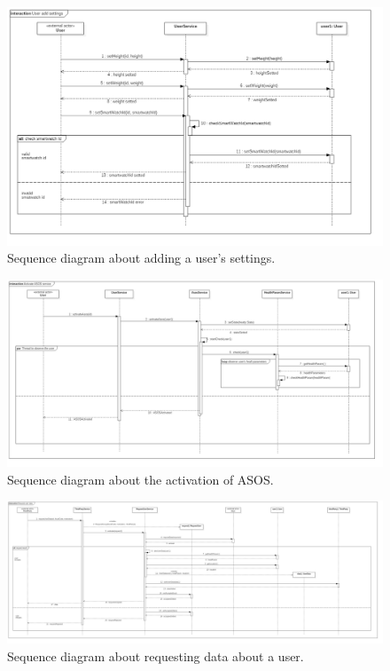 \begin{figure}[h!]
	\includegraphics[width=1.0\textwidth]{./pictures/sequence_userSettings.png}\par
	\caption{Sequence diagram about adding a user's settings.}
\end{figure}
\FloatBarrier 

\begin{figure}[h!]
	\includegraphics[width=1.0\textwidth]{./pictures/sequence_activateAsos.png}\par
	\caption{Sequence diagram about the activation of ASOS.}
\end{figure}
\FloatBarrier 

\begin{figure}[h!]
	\includegraphics[width=1.0\textwidth]{./pictures/sequence_userRequest.png}\par
	\caption{Sequence diagram about requesting data about a user.}
\end{figure}
\FloatBarrier 

